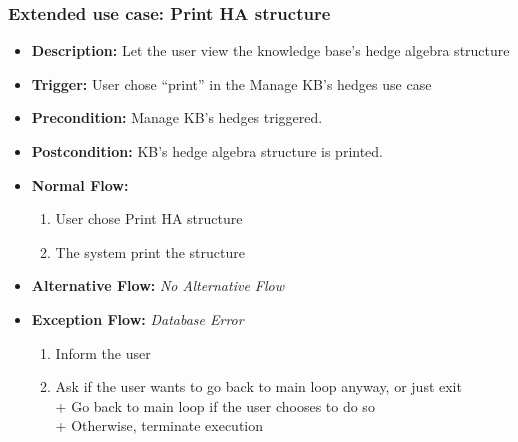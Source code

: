\documentclass[../gr-final.tex]{subfiles}
\begin{document}
\subsubsection{Extended use case: Print HA structure}
\begin{itemize}
  \item {\bfseries Description:} Let the user view the knowledge
    base's hedge algebra structure
  \item {\bfseries Trigger:} User chose ``print'' in the
    Manage KB's hedges use case
  \item {\bfseries Precondition:} Manage KB's hedges triggered.    
  \item {\bfseries Postcondition:} KB's hedge algebra structure is printed.
  \item {\bfseries Normal Flow:}
    \begin{enumerate}
      \item User chose Print HA structure
      \item The system print the structure
    \end{enumerate}
  \item {\bfseries Alternative Flow:} {\em No Alternative Flow}
  \item {\bfseries Exception Flow:} 
    {\em Database Error}
    \begin{enumerate}
      \item Inform the user
      \item Ask if the user wants to go back to main loop anyway,
        or just exit\\
        \indent + Go back to main loop if the user chooses to do
        so\\
        \indent + Otherwise, terminate execution
    \end{enumerate}
\end{itemize}
\end{document}
